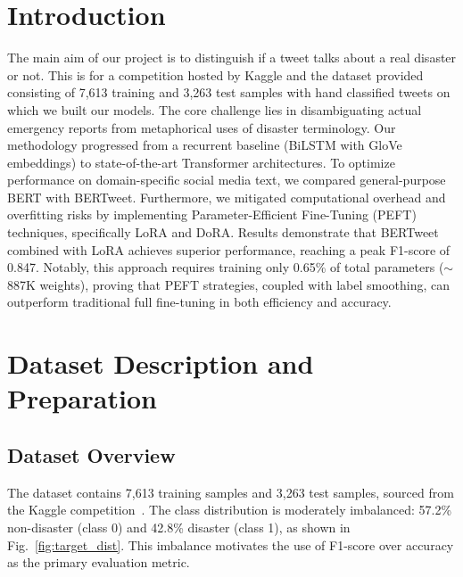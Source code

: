 \documentclass[conference]{IEEEtran}
\begin{document}

\section{Introduction}
The main aim of our project is to distinguish if a tweet talks about a real disaster or not. This is for a competition hosted by Kaggle \cite{kaggle} and the dataset provided consisting of 7,613 training and 3,263 test samples with hand classified tweets on which we built our models. The core challenge lies in disambiguating actual emergency reports from metaphorical uses of disaster terminology. Our methodology progressed from a recurrent baseline (BiLSTM with GloVe embeddings) to state-of-the-art Transformer architectures. To optimize performance on domain-specific social media text, we compared general-purpose BERT with BERTweet. Furthermore, we mitigated computational overhead and overfitting risks by implementing Parameter-Efficient Fine-Tuning (PEFT) techniques, specifically LoRA and DoRA.  Results demonstrate that BERTweet combined with LoRA achieves superior performance, reaching a peak F1-score of 0.847. Notably, this approach requires training only 0.65\% of total parameters ($\sim$887K weights), proving that PEFT strategies, coupled with label smoothing, can outperform traditional full fine-tuning in both efficiency and accuracy.%

\section{Dataset Description and Preparation}

\subsection{Dataset Overview}
The dataset contains 7{,}613 training samples and 3{,}263 test samples, sourced from the Kaggle competition~\cite{kaggle}. The class distribution is moderately imbalanced: 57.2\% non-disaster (class 0) and 42.8\% disaster (class 1), as shown in Fig.~\ref{fig:target_dist}. This imbalance motivates the use of F1-score over accuracy as the primary evaluation metric.
\end{document}
